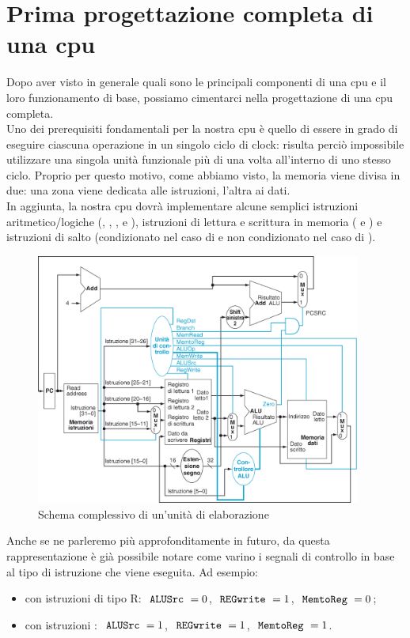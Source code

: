 \documentclass[class=book, crop=false, oneside]{standalone}
\begin{document}
\section{Prima progettazione completa di una \acrshort{cpu}}
Dopo aver visto in generale quali sono le principali componenti di una \acrshort{cpu} e il loro funzionamento di base, possiamo cimentarci nella progettazione di una \acrshort{cpu} completa.\\
Uno dei prerequisiti fondamentali per la nostra \acrshort{cpu} è quello di essere in grado di eseguire ciascuna operazione in un singolo ciclo di clock: risulta perciò impossibile utilizzare una singola unità funzionale più di una volta all'interno di uno stesso ciclo. Proprio per questo motivo, come abbiamo visto, la memoria viene divisa in due: una zona viene dedicata alle istruzioni, l'altra ai dati.\\
In aggiunta, la nostra \acrshort{cpu} dovrà implementare alcune semplici istruzioni aritmetico/logiche (, , ,  e ), istruzioni di lettura e scrittura in memoria ( e ) e istruzioni di salto (condizionato nel caso di  e non condizionato nel caso di ).

\begin{figure}[H]
	\centering
	\includegraphics[width=0.95\textwidth,keepaspectratio]{schema_complessivo.png}
	\caption{Schema complessivo di un'unità di elaborazione}
\end{figure}
Anche se ne parleremo più approfonditamente in futuro, da questa rappresentazione è già possibile notare come varino i segnali di controllo in base al tipo di istruzione che viene eseguita. Ad esempio:
\begin{itemize}
	\item con istruzioni di tipo R: \(\textrm{ \texttt{ALUSrc} }=0\), \(\textrm{ \texttt{REGwrite} }= 1\), \(\textrm{ \texttt{MemtoReg} }=0\);
	\item con istruzioni : \(\textrm{ \texttt{ALUSrc} }=1\), \(\textrm{ \texttt{REGwrite} }= 1\), \(\textrm{ \texttt{MemtoReg} }=1\).
\end{itemize}
\end{document}
